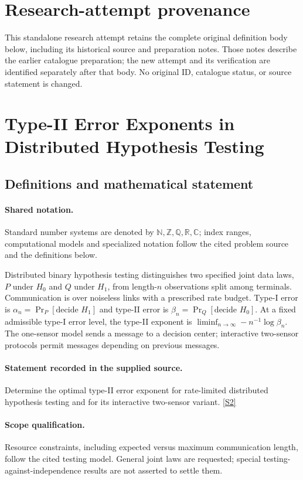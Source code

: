\documentclass[11pt]{article}
\begin{document}
\section*{Research-attempt provenance}
This standalone research attempt retains the complete original definition body below,
including its historical source and preparation notes. Those notes describe the
earlier catalogue preparation; the new attempt and its verification are identified
separately after that body. No original ID, catalogue status, or source statement is changed.

\section{Type-II Error Exponents in Distributed Hypothesis Testing}\label{statement}

\subsection{Definitions and mathematical statement}

\paragraph{Shared notation.}Standard number systems are denoted by $\mathbb N,\mathbb Z,\mathbb Q,\mathbb R,\mathbb C$; index ranges, computational models and specialized notation follow the cited problem source and the definitions below.


Distributed binary hypothesis testing distinguishes two specified joint data laws, $P$ under $H_0$ and $Q$ under $H_1$, from length-$n$ observations split among terminals. Communication is over noiseless links with a prescribed rate budget. Type-I error is $\alpha_n=\Pr_P[\text{decide }H_1]$ and type-II error is $\beta_n=\Pr_Q[\text{decide }H_0]$. At a fixed admissible type-I error level, the type-II exponent is $\liminf_{n\to\infty}-n^{-1}\log\beta_n$. The one-sensor model sends a message to a decision center; interactive two-sensor protocols permit messages depending on previous messages.
\paragraph{Statement recorded in the supplied source.}
Determine the optimal type-II error exponent for rate-limited distributed hypothesis testing and for its interactive two-sensor variant. \href{https://doi.org/10.4171/owr/2022/14}{[S2]}
\paragraph{Scope qualification.}
Resource constraints, including expected versus maximum communication length, follow the cited testing model. General joint laws are requested; special testing-against-independence results are not asserted to settle them.
\end{document}
